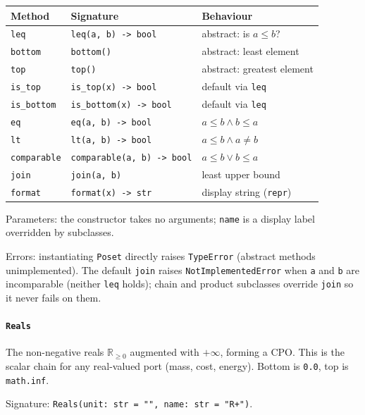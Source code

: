 \documentclass[11pt,a4paper]{article}
\newcommand{\Rplus}{\mathbb{R}_{\geq 0}}
\begin{document}
\begin{center}
\begin{tabular}{@{}lll@{}}
\toprule
Method & Signature & Behaviour \\
\midrule
\texttt{leq}        & \texttt{leq(a, b) -> bool}   & abstract: is $a \leq b$? \\
\texttt{bottom}     & \texttt{bottom()}            & abstract: least element \\
\texttt{top}        & \texttt{top()}               & abstract: greatest element \\
\texttt{is\_top}    & \texttt{is\_top(x) -> bool}  & default via \texttt{leq} \\
\texttt{is\_bottom} & \texttt{is\_bottom(x) -> bool}& default via \texttt{leq} \\
\texttt{eq}         & \texttt{eq(a, b) -> bool}    & $a \leq b \wedge b \leq a$ \\
\texttt{lt}         & \texttt{lt(a, b) -> bool}    & $a \leq b \wedge a \neq b$ \\
\texttt{comparable} & \texttt{comparable(a, b) -> bool}& $a \leq b \vee b \leq a$ \\
\texttt{join}       & \texttt{join(a, b)}          & least upper bound \\
\texttt{format}     & \texttt{format(x) -> str}    & display string (\texttt{repr}) \\
\bottomrule
\end{tabular}
\end{center}

Parameters: the constructor takes no arguments; \texttt{name} is a
display label overridden by subclasses.

Errors: instantiating \texttt{Poset} directly raises \texttt{TypeError}
(abstract methods unimplemented). The default \texttt{join} raises
\texttt{NotImplementedError} when \texttt{a} and \texttt{b} are
incomparable (neither \texttt{leq} holds); chain and product subclasses
override \texttt{join} so it never fails on them.

\paragraph{\texttt{Reals}}
\label{ref:posets:reals}
The non-negative reals $\Rplus$ augmented with $+\infty$, forming a CPO.
This is the scalar chain for any real-valued port (mass, cost, energy).
Bottom is \texttt{0.0}, top is \texttt{math.inf}.

Signature: \texttt{Reals(unit: str = "", name: str = "R+")}.
\end{document}
